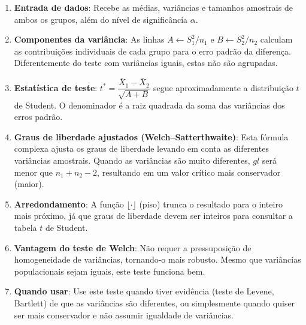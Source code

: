 \documentclass[12pt,a4paper]{article}
\begin{document}
\begin{enumerate}
  \item \textbf{Entrada de dados}: Recebe as médias, variâncias e tamanhos amostrais de ambos
  os grupos, além do nível de significância $\alpha$.

  \item \textbf{Componentes da variância}: As linhas $A \gets S_1^2/n_1$ e $B \gets S_2^2/n_2$
  calculam as contribuições individuais de cada grupo para o erro padrão da diferença.
  Diferentemente do teste com variâncias iguais, estas não são agrupadas.

  \item \textbf{Estatística de teste}: $t^* = \dfrac{\bar{X}_1 - \bar{X}_2}{\sqrt{A+B}}$
  segue aproximadamente a distribuição $t$ de Student. O denominador é a raiz quadrada
  da soma das variâncias dos erros padrão.

  \item \textbf{Graus de liberdade ajustados (Welch--Satterthwaite)}: Esta fórmula complexa
  ajusta os graus de liberdade levando em conta as diferentes variâncias amostrais.
  Quando as variâncias são muito diferentes, $gl$ será menor que $n_1 + n_2 - 2$,
  resultando em um valor crítico mais conservador (maior).

  \item \textbf{Arredondamento}: A função $\lfloor \cdot \rfloor$ (piso) trunca o resultado
  para o inteiro mais próximo, já que graus de liberdade devem ser inteiros para consultar
  a tabela $t$ de Student.

  \item \textbf{Vantagem do teste de Welch}: Não requer a pressuposição de homogeneidade
  de variâncias, tornando-o mais robusto. Mesmo que variâncias populacionais sejam iguais,
  este teste funciona bem.

  \item \textbf{Quando usar}: Use este teste quando tiver evidência (teste de Levene, Bartlett)
  de que as variâncias são diferentes, ou simplesmente quando quiser ser mais conservador
  e não assumir igualdade de variâncias.
\end{enumerate}
\end{document}
